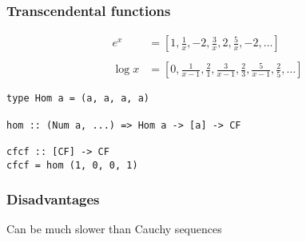 \documentclass[11pt,aspectratio=169]{beamer}
\begin{document}
\begin{frame}[fragile]
\frametitle{Transcendental functions}
\pause
\begin{align*}
e^x &= [1, \frac{1}{x}, -2, \frac{3}{x}, 2, \frac{5}{x}, -2, \dots] \\
~\\
\log x &= [0, \frac{1}{x-1}, \frac{2}{1}, \frac{3}{x-1}, \frac{2}{3}, \frac{5}{x-1}, \frac{2}{5}, \dots]
\end{align*} %
\pause
\begin{verbatim}
type Hom a = (a, a, a, a)

hom :: (Num a, ...) => Hom a -> [a] -> CF

cfcf :: [CF] -> CF
cfcf = hom (1, 0, 0, 1)
\end{verbatim}
\end{frame}

\begin{frame}
\frametitle{Disadvantages}
Can be much slower than Cauchy sequences
\end{frame}

\begin{frame}
\nocite{*}
\printbibliography
\end{frame}
\end{document}
